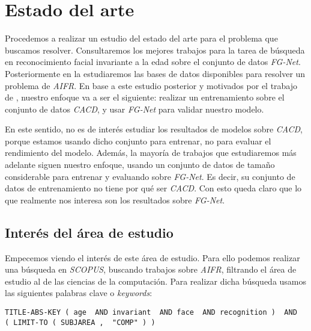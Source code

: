 \chapter{Estado del arte} \label{ich:estado_arte}


Procedemos a realizar un estudio del estado del arte para el problema que buscamos resolver. Consultaremos los mejores trabajos para la tarea de búsqueda en reconocimiento facial invariante a la edad sobre el conjunto de datos \textit{FG-Net}. Posteriormente en la  estudiaremos las bases de datos disponibles para resolver un problema de \textit{AIFR}. En base a este estudio posterior y motivados por el trabajo de \cite{informatica:best_fgnet_model}, nuestro enfoque va a ser el siguiente: realizar un entrenamiento sobre el conjunto de datos \textit{CACD}, y usar \textit{FG-Net} para validar nuestro modelo.

En este sentido, no es de interés estudiar los resultados de modelos sobre \textit{CACD}, porque estamos usando dicho conjunto para entrenar, no para evaluar el rendimiento del modelo. Además, la mayoría de trabajos que estudiaremos más adelante siguen nuestro enfoque, usando un conjunto de datos de tamaño considerable para entrenar y evaluando sobre \textit{FG-Net}. Es decir, su conjunto de datos de entrenamiento no tiene por qué ser \textit{CACD}. Con esto queda claro que lo que realmente nos interesa son los resultados sobre \textit{FG-Net}.

\section{Interés del área de estudio} \label{isec:interesareaestudio}

Empecemos viendo el interés de este área de estudio. Para ello podemos realizar una búsqueda en \textit{SCOPUS}, buscando trabajos sobre \textit{AIFR}, filtrando el área de estudio al de las ciencias de la computación. Para realizar dicha búsqueda usamos las siguientes palabras clave o \textit{keywords}:

\begin{lstlisting}[caption=\textit{Keywords usadas para la búsqueda en \textit{SCOPUS}. Búsqueda realizada el 17 de Septiembre de 2023}, label=code:scopus_search, captionpos=b]
    TITLE-ABS-KEY ( age  AND invariant  AND face  AND recognition )  AND  ( LIMIT-TO ( SUBJAREA ,  "COMP" ) )
\end{lstlisting}

